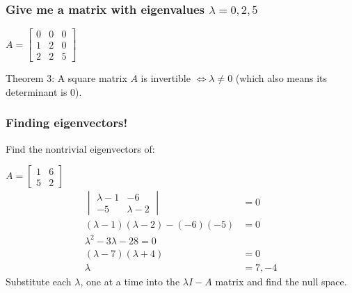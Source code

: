 \documentclass[
  letterpaper,
  DIV=11,
  numbers=noendperiod]{scrartcl}
\begin{document}
\subsubsection{\texorpdfstring{Give me a matrix with eigenvalues
\(\lambda = 0, 2, 5\)}{Give me a matrix with eigenvalues \textbackslash lambda = 0, 2, 5}}\label{give-me-a-matrix-with-eigenvalues-lambda-0-2-5}

\(A = \begin{bmatrix}0 & 0 & 0 \\ 1 & 2 & 0 \\ 2 & 2 & 5\end{bmatrix}\)

Theorem 3: A square matrix \(A\) is invertible \(\iff \lambda \neq 0\)
(which also means its determinant is 0).

\subsubsection{Finding eigenvectors!}\label{finding-eigenvectors}

Find the nontrivial eigenvectors of:

\(A = \begin{bmatrix}1 & 6 \\ 5 & 2\end{bmatrix}\) \begin{align*}
\begin{vmatrix}\lambda-1 & -6 \\ -5 & \lambda-2\end{vmatrix} &= 0 \\
(\lambda-1)(\lambda-2)-(-6)(-5) &= 0 \\
\lambda^2-3\lambda-28=0 \\
(\lambda-7)(\lambda+4) &= 0 \\
\lambda &= 7, -4
\end{align*} Substitute each \(\lambda\), one at a time into the
\(\lambda I - A\) matrix and find the null space.
\end{document}
